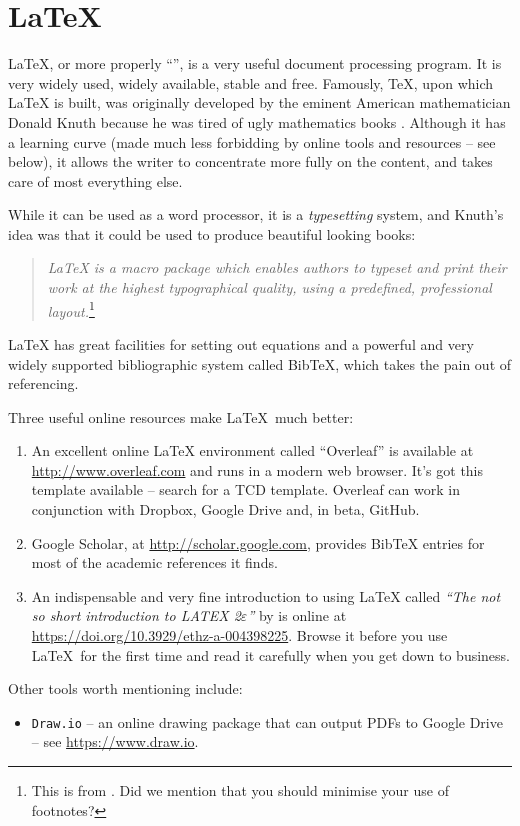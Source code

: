 \chapter{\LaTeX}
\label{latexchapter}
\LaTeX{}, or more properly ``\LaTeXe{}'', is a very useful document processing program. It is very widely used, widely available, stable and free. Famously, \TeX, upon which \LaTeX{} is built, was originally developed by the eminent American mathematician Donald Knuth because he was tired of ugly mathematics books \cite{shustek2008interview}. Although it has a learning curve (made much less forbidding by online tools and resources -- see below), it allows the writer to concentrate more fully on the content, and takes care of most everything else.

While it can be used as a word processor, it is a \emph{typesetting} system, and Knuth's idea was that it could be used to produce beautiful looking books:
\begin{quote}
\emph{\LaTeX{} is a macro package which enables authors to typeset and print their work at the highest typographical quality, using a predefined, professional layout.}\footnote{This is from \cite{oetiker2001not}. Did we mention that you should minimise your use of footnotes?}
\end{quote}
\LaTeX{} has great facilities for setting out equations and a powerful and very widely supported bibliographic system called BibTeX, which takes the pain out of referencing.

Three useful online resources make \LaTeX~much better:
\begin{enumerate}[(1)]
\item An excellent online \LaTeX{} environment called ``Overleaf'' is available at \url{http://www.overleaf.com} and runs in a modern web browser. It's got this template available -- search for a TCD template. Overleaf can work in conjunction with Dropbox, Google Drive and, in beta, GitHub.
\item Google Scholar, at \url{http://scholar.google.com}, provides BibTeX entries for most of the academic references it finds.
\item An indispensable and very fine introduction to using \LaTeX{} called \emph{``The not so short introduction to LATEX 2$\varepsilon$''} by \cite{oetiker2001not} is online at \url{https://doi.org/10.3929/ethz-a-004398225}. Browse it before you use \LaTeX~for the first time and  read it carefully when you get down to business.
\end{enumerate}
Other tools worth mentioning include:
\begin{itemize}
\item \texttt{Draw.io} -- an online drawing package that can output PDFs to Google Drive -- see \url{https://www.draw.io}.
\end{itemize}